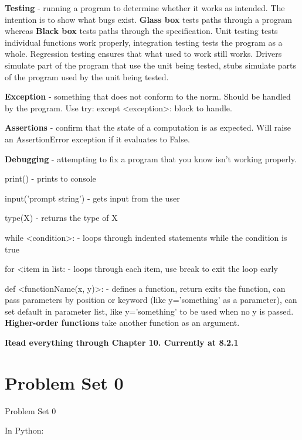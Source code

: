\textbf{Testing} - running a program to determine whether it works as intended. The intention is to show what bugs exist. \textbf{Glass box} tests paths through a program whereas \textbf{Black box} tests paths through the specification. Unit testing tests individual functions work properly, integration testing tests the program as a whole. Regression testing ensures that what used to work still works. Drivers simulate part of the program that use the unit being tested, stubs simulate parts of the program used by the unit being tested.

\textbf{Exception} - something that does not conform to the norm. Should be handled by the program. Use try: except <exception>: block to handle.

\textbf{Assertions} - confirm that the state of a computation is as expected. Will raise an AssertionError exception if it evaluates to False.

\textbf{Debugging} - attempting to fix a program that you know isn't working properly.

print() - prints to  console 

input('prompt string') - gets input from the user

type(X) - returns the type of X

while <condition>: - loops through indented statements while the condition is true

for <item in list: - loops through each item, use break to exit the loop early

def <functionName(x, y)>: - defines a function, return exits the function, can pass parameters by position or keyword (like y='something' as a parameter), can set default in parameter list, like y='something' to be used when no y is passed. \textbf{Higher-order functions} take another function as an argument.





\textbf{Read everything through Chapter 10. Currently at 8.2.1}

\newpage
\onecolumn
\section{Problem Set 0}

\begin{problem}{Problem Set 0}
\end{problem}
\begin{solution}
In Python:



\end{solution}
\newpage
